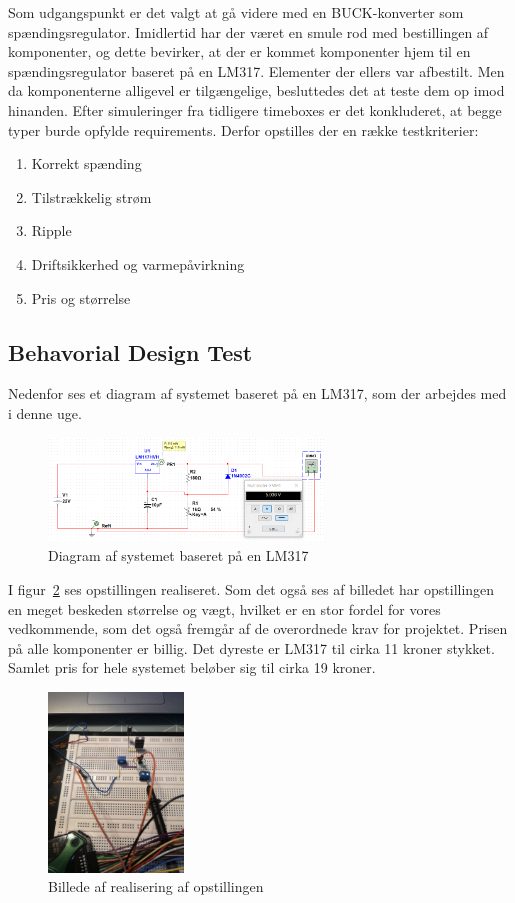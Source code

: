 Som udgangspunkt er det valgt at gå videre med en BUCK-konverter som spændingsregulator. Imidlertid har der været en smule rod med bestillingen af komponenter, og dette bevirker, at der er kommet komponenter hjem til en spændingsregulator baseret på en LM317. Elementer der ellers var afbestilt. Men da komponenterne alligevel er tilgængelige, besluttedes det at teste dem op imod hinanden. Efter simuleringer fra tidligere timeboxes er det konkluderet, at begge typer burde opfylde requirements. Derfor opstilles der en række testkriterier:

\begin{enumerate}
\item Korrekt spænding
\item Tilstrækkelig strøm
\item Ripple
\item Driftsikkerhed og varmepåvirkning 
\item Pris og størrelse
\end{enumerate}

\subsection{Behavorial Design Test}
\label{sec:behav-design-test}

Nedenfor ses et diagram af systemet baseret på en LM317, som der arbejdes med i denne uge.

\begin{figure}[h]
  \centering
  \includegraphics[width=0.65\textwidth]{srcirc.png}
  \caption{Diagram af systemet baseret på en LM317}
  \label{fig:srcirc}
\end{figure}
\clearpage
I figur~\ref{fig:srreal} ses opstillingen realiseret. Som det også ses af billedet har opstillingen en meget beskeden størrelse og vægt, hvilket er en stor fordel for vores vedkommende, som det også fremgår af de overordnede krav for projektet. Prisen på alle komponenter er billig. Det dyreste er LM317 til cirka 11 kroner stykket. Samlet pris for hele systemet beløber sig til cirka 19 kroner.

\begin{figure}[h]
  \centering
  \includegraphics[width=0.32\textwidth]{srreal.jpg}
  \caption{Billede af realisering af opstillingen}
  \label{fig:srreal}
\end{figure}

